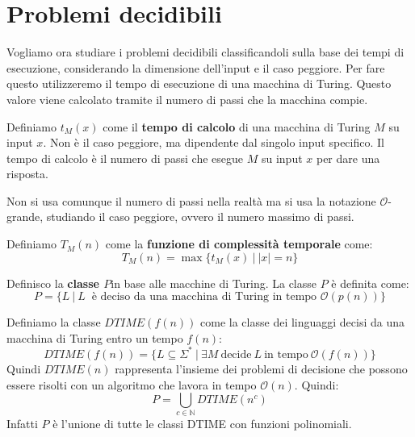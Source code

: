 \section{Problemi decidibili}
Vogliamo ora studiare i problemi decidibili classificandoli sulla base dei tempi
di esecuzione, considerando la dimensione dell'input e il caso peggiore. Per fare
questo utilizzeremo il tempo di esecuzione di una macchina di Turing. Questo
valore viene calcolato tramite il numero di passi che la macchina compie.
\begin{definizione}
    Definiamo $t_M(x)$ come il \textbf{tempo di calcolo} di una macchina di
    Turing $M$ su input $x$. Non è il caso peggiore, ma dipendente dal singolo
    input specifico. Il tempo di calcolo è il numero di passi che esegue $M$ su
    input $x$ per dare una risposta.
\end{definizione}
Non si usa comunque il numero di passi nella realtà ma si usa la notazione
$\mathcal{O}$-grande, studiando il caso peggiore, ovvero il numero massimo di
passi.
\begin{definizione}
    Definiamo $T_M(n)$ come la \textbf{funzione di complessità temporale} come:
    \begin{equation}
        T_M(n) = \max \{t_M(x) \ | \ |x| = n\}
    \end{equation}
\end{definizione}
\begin{definizione}
    Definisco la \textbf{classe $P$}in base alle macchine di Turing. La classe $P$ è
    definita come:
    \begin{equation}
        P = \{L \ | \ L \ \text{ è deciso da una macchina di Turing in tempo }
        \mathcal{O}(p(n))\}
    \end{equation}
\end{definizione}
\begin{definizione}
    Definiamo la classe $DTIME(f(n))$ come la classe dei linguaggi decisi da una
    macchina di Turing entro un tempo $f(n)$:
    \begin{equation}
        DTIME(f(n)) = \{L \subseteq \Sigma^{\ast} \ | \ \exists M \
        \text{decide} \ L \ \text{in tempo} \ \mathcal{O}(f(n)) \}
    \end{equation}
    Quindi $DTIME(n)$ rappresenta l'insieme dei problemi di decisione che possono
    essere risolti con un algoritmo che lavora in tempo $\mathcal{O}(n)$. Quindi:
    \begin{equation}
        P = \bigcup_{c \in \mathbb{N}} DTIME(n^c)
    \end{equation}
    Infatti $P$ è l'unione di tutte le classi DTIME con funzioni polinomiali.
\end{definizione}
